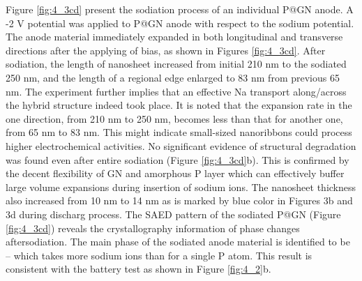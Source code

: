 Figure \ref{fig:4_3cd} present the sodiation process of an individual P@GN anode.
A -2 V potential was applied to P@GN anode with respect to the sodium potential.
The anode material immediately expanded in both longitudinal and transverse directions after the applying of bias, as shown in Figures \ref{fig:4_3cd}. 
After sodiation, the length of nanosheet increased from initial 210 nm to the sodiated 250 nm, and the length of a regional edge enlarged to 83 nm from previous 65 nm. 
The experiment further implies that an effective Na transport along/across the hybrid structure indeed took place. 
It is noted that the expansion rate in the one direction, from 210 nm to 250 nm, becomes less than that for another one, from 65 nm to 83 nm. This might indicate small-sized nanoribbons could process higher electrochemical activities. 
No significant evidence of structural degradation was found even after entire sodiation (Figure \ref{fig:4_3cd}b). This is confirmed by the decent flexibility of GN and amorphous P layer which can effectively buffer large volume expansions during insertion of sodium ions. 
The nanosheet thickness also increased from 10 nm to 14 nm as is marked by blue color in Figures 3b and  3d during discharg process. 
The SAED pattern of the sodiated P@GN (Figure \ref{fig:4_3cd}) reveals the crystallography information of phase changes aftersodiation. 
The main phase of the sodiated anode material is identified to be  -- which takes more sodium ions than  for a single P atom. This result is consistent with the battery test as shown in Figure \ref{fig:4_2}b. 

